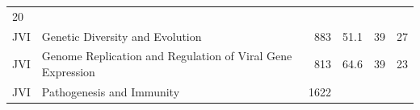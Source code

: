 \documentclass[11pt,]{article}
\begin{document}
\begin{longtable}[]{@{}llrrrr@{}}
\begin{minipage}[t]{0.11\columnwidth}
20\strut
\end{minipage}\tabularnewline
\begin{minipage}[t]{0.06\columnwidth}\raggedright\strut
JVI\strut
\end{minipage} & \begin{minipage}[t]{0.43\columnwidth}\raggedright\strut
Genetic Diversity and Evolution\strut
\end{minipage} & \begin{minipage}[t]{0.04\columnwidth}\raggedleft\strut
883\strut
\end{minipage} & \begin{minipage}[t]{0.08\columnwidth}\raggedleft\strut
51.1\strut
\end{minipage} & \begin{minipage}[t]{0.11\columnwidth}\raggedleft\strut
39\strut
\end{minipage} & \begin{minipage}[t]{0.11\columnwidth}\raggedleft\strut
27\strut
\end{minipage}\tabularnewline
\begin{minipage}[t]{0.06\columnwidth}\raggedright\strut
JVI\strut
\end{minipage} & \begin{minipage}[t]{0.43\columnwidth}\raggedright\strut
Genome Replication and Regulation of Viral Gene Expression\strut
\end{minipage} & \begin{minipage}[t]{0.04\columnwidth}\raggedleft\strut
813\strut
\end{minipage} & \begin{minipage}[t]{0.08\columnwidth}\raggedleft\strut
64.6\strut
\end{minipage} & \begin{minipage}[t]{0.11\columnwidth}\raggedleft\strut
39\strut
\end{minipage} & \begin{minipage}[t]{0.11\columnwidth}\raggedleft\strut
23\strut
\end{minipage}\tabularnewline
\begin{minipage}[t]{0.06\columnwidth}\raggedright\strut
JVI\strut
\end{minipage} & \begin{minipage}[t]{0.43\columnwidth}\raggedright\strut
Pathogenesis and Immunity\strut
\end{minipage} & \begin{minipage}[t]{0.04\columnwidth}\raggedleft\strut
1622\strut
\end{minipage} & \begin{minipage}[t]{0.08\columnwidth}\raggedleft\strut

\end{minipage}
\end{longtable}
\end{document}
